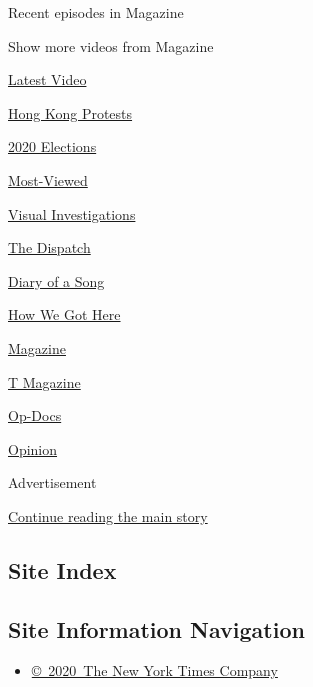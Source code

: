 Recent episodes in Magazine

Show more videos from Magazine

\href{/video}{}

\href{/video/latest-video}{Latest Video}

\href{/video/hk-protest}{Hong Kong Protests}

\href{/video/2020-Elections}{2020 Elections}

\href{/video/Most-Viewed}{Most-Viewed}

\href{/video/investigations}{Visual Investigations}

\href{/video/on-the-ground}{The Dispatch}

\href{/video/diaryofasong}{Diary of a Song}

\href{/video/how-we-got-here}{How We Got Here}

\href{/video/magazine}{Magazine}

\href{/video/t-magazine}{T Magazine}

\href{/video/op-docs}{Op-Docs}

\href{/video/opinion}{Opinion}

Advertisement

\protect\hyperlink{after-bottom}{Continue reading the main story}

\hypertarget{site-index}{%
\subsection{Site Index}\label{site-index}}

\hypertarget{site-information-navigation}{%
\subsection{Site Information
Navigation}\label{site-information-navigation}}

\begin{itemize}
\tightlist
\item
  \href{https://help.nytimes.com/hc/en-us/articles/115014792127-Copyright-notice}{©~2020~The
  New York Times Company}
\end{itemize}

